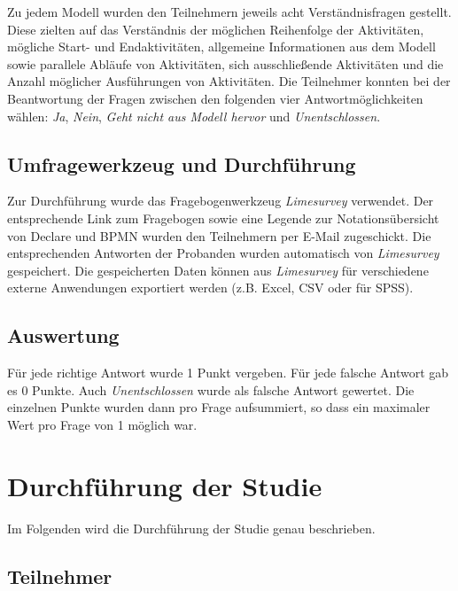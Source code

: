 Zu jedem Modell wurden den Teilnehmern jeweils acht Verständnisfragen gestellt. Diese zielten auf das Verständnis der möglichen Reihenfolge der Aktivitäten, mögliche Start- und Endaktivitäten, allgemeine Informationen aus dem Modell sowie parallele Abläufe von Aktivitäten, sich ausschließende Aktivitäten und die Anzahl möglicher Ausführungen von Aktivitäten.\newline
Die Teilnehmer konnten bei der Beantwortung der Fragen zwischen den folgenden vier Antwortmöglichkeiten wählen: \textit{Ja}, \textit{Nein}, \textit{Geht nicht aus Modell hervor} und \textit{Unentschlossen}.

\subsection{Umfragewerkzeug und Durchführung}

Zur Durchführung wurde das Fragebogenwerkzeug \textit{Limesurvey} verwendet. Der entsprechende Link zum Fragebogen sowie eine Legende zur Notationsübersicht von Declare und BPMN wurden den Teilnehmern per E-Mail zugeschickt. Die entsprechenden Antworten der Probanden wurden automatisch von \textit{Limesurvey} gespeichert. Die gespeicherten Daten können aus \textit{Limesurvey} für verschiedene externe Anwendungen exportiert werden (z.B. Excel, CSV oder für SPSS).

\subsection{Auswertung}

Für jede richtige Antwort wurde 1 Punkt vergeben. Für jede falsche Antwort gab es 0 Punkte. Auch \textit{Unentschlossen} wurde als falsche Antwort gewertet. Die einzelnen Punkte wurden dann pro Frage aufsummiert, so dass ein maximaler Wert pro Frage von 1 möglich war.

\section{Durchführung der Studie}

Im Folgenden wird die Durchführung der Studie genau beschrieben.

\subsection{Teilnehmer}

